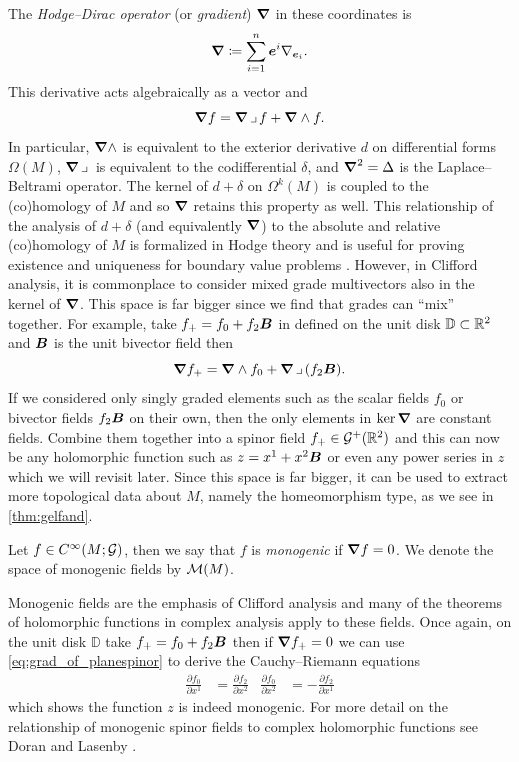 \documentclass{article}
\begin{document}
The \emph{Hodge--Dirac operator} (or \emph{gradient}) $\boldsymbol{\nabla}$ in these coordinates is
\begin{equation}
    \boldsymbol{\nabla} \coloneqq \sum_{i=1}^n \boldsymbol{e}^i \nabla_{\boldsymbol{e}_i}.
\end{equation}
This derivative acts algebraically as a vector and
\begin{equation}
\label{eq:grad_of_planespinor}
\boldsymbol{\nabla} f = \boldsymbol{\nabla} \hspace*{.5mm}\lrcorner \hspace*{.5mm} f + \boldsymbol{\nabla} \wedge f.
\end{equation}
In particular, $\boldsymbol{\nabla} \wedge$ is equivalent to the exterior derivative $d$ on differential forms $\Omega(M)$, $\boldsymbol{\nabla} \hspace*{.5mm}\lrcorner \hspace*{.5mm}$ is equivalent to the codifferential $\delta$, and $\boldsymbol{\nabla}^2 = \Delta$ is the Laplace--Beltrami operator. The kernel of $d+\delta$ on $\Omega^k(M)$ is coupled to the (co)homology of $M$ and so $\boldsymbol{\nabla}$ retains this property as well. This relationship of the analysis of $d+\delta$ (and equivalently $\boldsymbol{\nabla}$) to the absolute and relative (co)homology of $M$ is formalized in Hodge theory and is useful for proving existence and uniqueness for boundary value problems \cite{schwarz_hodge_1995}. However, in Clifford analysis, it is commonplace to consider mixed grade multivectors also in the kernel of $\boldsymbol{\nabla}$. This space is far bigger since we find that grades can ``mix'' together. For example, take $f_+ = f_0 + f_2 \boldsymbol{B}$ in defined on the unit disk $\mathbb{D} \subset \mathbb{R}^2$ and $\boldsymbol{B}$ is the unit bivector field then
\begin{equation}
\boldsymbol{\nabla} f_+ = \boldsymbol{\nabla} \wedge f_0 + \boldsymbol{\nabla} \hspace*{.5mm}\lrcorner \hspace*{.5mm} ( f_2 \boldsymbol{B}).
\end{equation}
If we considered only singly graded elements such as the scalar fields $f_0$ or bivector fields $f_2 \boldsymbol{B}$ on their own, then the only elements in $\ker \boldsymbol{\nabla}$ are constant fields. Combine them together into a spinor field $f_+ \in \mathcal{G}^+(\mathbb{R}^2)$ and this can now be any holomorphic function such as $z=x^1+x^2\boldsymbol{B}$ or even any power series in $z$ which we will revisit later. Since this space is far bigger, it can be used to extract more topological data about $M$, namely the homeomorphism type, as we see in \cref{thm:gelfand}.

\begin{definition}
Let $f\in C^\infty(M;\mathcal{G})$, then we say that $f$ is \emph{monogenic} if $\boldsymbol{\nabla} f = 0$. We denote the space of monogenic fields by $\mathcal{M}(M)$.
\end{definition}

Monogenic fields are the emphasis of Clifford analysis and many of the theorems of holomorphic functions in complex analysis apply to these fields. Once again, on the unit disk $\mathbb{D}$ take $f_+ = f_0 + f_2 \boldsymbol{B}$ then if $\boldsymbol{\nabla} f_+ =0$ we can use \cref{eq:grad_of_planespinor} to derive the Cauchy--Riemann equations
\begin{align}
\label{eq:cauchy_riemann_equations}
\frac{\partial f_0}{\partial x^1} &= \frac{\partial f_2}{\partial x^2} & \frac{\partial f_0}{\partial x^2} &= -\frac{\partial f_2}{\partial x^1}
\end{align}
which shows the function $z$ is indeed monogenic. For more detail on the relationship of monogenic spinor fields to complex holomorphic functions see Doran and Lasenby \cite[\S 6.3.1]{doran_geometric_2003}.
\end{document}
